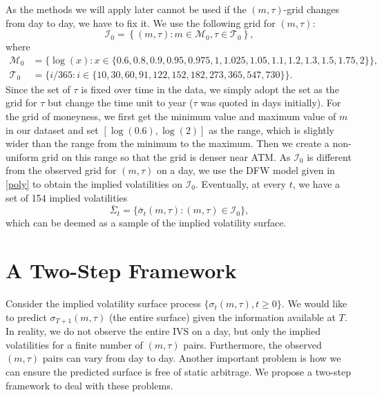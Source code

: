 \documentclass[11pt,a4paper]{article}
\theoremstyle{remark}
\begin{document}
As the methods we will apply later cannot be used if the $(m,\tau)$-grid changes from day to day, we have to fix it. We use the following grid for $(m,\tau)$:
\begin{equation}\label{sample-grid}
	\mathcal{I}_{0}=\left\{(m, \tau): m \in \mathcal{M}_{0}, \tau \in \mathcal{T}_{0}\right\},
\end{equation}
where
\begin{align}
\mathcal{M}_{0}&=\{\log (x): x \in\{0.6, 0.8, 0.9, 0.95, 0.975, 1, 1.025, 1.05, 1.1, 1.2, 1.3, 1.5, 1.75, 2\}\}, \\
\mathcal{T}_{0}&=\{i / 365: i \in\{10, 30, 60, 91, 122, 152, 182, 273, 365, 547, 730\}\}.
\end{align}
Since the set of $\tau$ is fixed over time in the data, we simply adopt the set as the grid for $\tau$ but change the time unit to year ($\tau$ was quoted in days initially). For the grid of moneyness, we first get the minimum value and maximum value of $m$ in our dataset and set $[\log(0.6),\log(2)]$ as the range, which is slightly wider than the range from the minimum to the maximum. Then we create a non-uniform grid on this range so that the grid is denser near ATM. As $\mathcal{I}_{0}$ is different from the observed grid for $(m,\tau)$ on a day, we use the DFW model given in \eqref{poly} to obtain the implied volatilities on $\mathcal{I}_{0}$. Eventually, at every $t$, we have a set of 154 implied volatilities
\begin{equation}\label{sample-IVS}
	\bar{\Sigma}_t=\{\bar{\sigma}_t(m,\tau): (m,\tau)\in \mathcal{I}_{0}\},
\end{equation}
which can be deemed as a sample of the implied volatility surface. 



\section{A Two-Step Framework}\label{sec:framework}
Consider the implied volatility surface process $\{\sigma_t(m,\tau), t\ge 0\}$. We would like to predict $\sigma_{T+1}(m,\tau)$ (the entire surface) given the information available at $T$. In reality, we do not observe the entire IVS on a day, but only the implied volatilities for a finite number of $(m,\tau)$ pairs. Furthermore, the observed $(m,\tau)$ pairs can vary from day to day. Another important problem is how we can ensure the predicted surface is free of static arbitrage. We propose a two-step framework to deal with these problems. 
\end{document}
